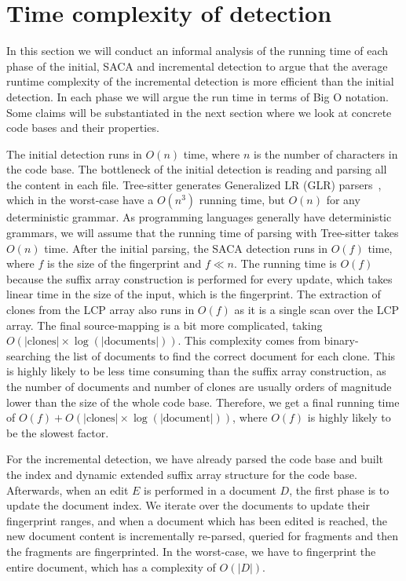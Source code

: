 \section{Time complexity of detection}

In this section we will conduct an informal analysis of the running time of each phase of
the initial, SACA and incremental detection to argue that the average runtime complexity
of the incremental detection is more efficient than the initial detection. In each phase
we will argue the run time in terms of Big O notation. Some claims will be substantiated
in the next section where we look at concrete code bases and their properties.

The initial detection runs in $O(n)$ time, where $n$ is the number of characters in the
code base. The bottleneck of the initial detection is reading and parsing all the content
in each file. Tree-sitter generates Generalized LR (GLR) parsers~\cite{GLR}, which in the
worst-case have a $O(n^3)$ running time, but $O(n)$ for any deterministic grammar. As
programming languages generally have deterministic grammars, we will assume that the
running time of parsing with Tree-sitter takes $O(n)$ time. After the initial parsing, the
SACA detection runs in $O(f)$ time, where $f$ is the size of the fingerprint and $f \ll
n$. The running time is $O(f)$ because the suffix array construction is performed for
every update, which takes linear time in the size of the input, which is the fingerprint.
The extraction of clones from the LCP array also runs in $O(f)$ as it is a single scan
over the LCP array. The final source-mapping is a bit more complicated, taking
$O(\vert\text{clones}\vert \times \log (\vert\text{documents}\vert))$. This complexity
comes from binary-searching the list of documents to find the correct document for each
clone. This is highly likely to be less time consuming than the suffix array construction,
as the number of documents and number of clones are usually orders of magnitude lower than
the size of the whole code base. Therefore, we get a final running time of $O(f) +
O(\vert\text{clones}\vert \times \log(\vert\text{document}\vert))$, where $O(f)$ is highly
likely to be the slowest factor.

For the incremental detection, we have already parsed the code base and built the index
and dynamic extended suffix array structure for the code base. Afterwards, when an edit
$E$ is performed in a document $D$, the first phase is to update the document index. We
iterate over the documents to update their fingerprint ranges, and when a document which
has been edited is reached, the new document content is incrementally re-parsed, queried
for fragments and then the fragments are fingerprinted. In the worst-case, we have to
fingerprint the entire document, which has a complexity of $O(\vert D\vert)$.

